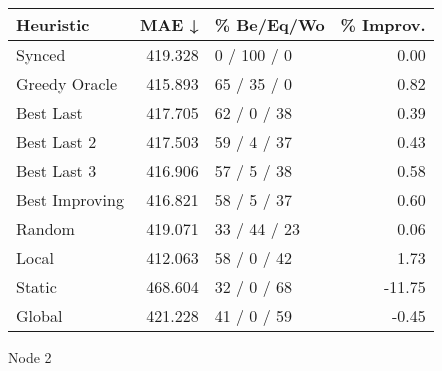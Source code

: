 \begin{tabular}{lrlr}
\toprule
\textbf{Heuristic} & \textbf{MAE ↓} & \textbf{\% Be/Eq/Wo} & \textbf{\% Improv.} \\
\midrule
            Synced &        419.328 &          0 / 100 / 0 &                0.00 \\
     Greedy Oracle &        415.893 &          65 / 35 / 0 &                0.82 \\
         Best Last &        417.705 &          62 / 0 / 38 &                0.39 \\
       Best Last 2 &        417.503 &          59 / 4 / 37 &                0.43 \\
       Best Last 3 &        416.906 &          57 / 5 / 38 &                0.58 \\
    Best Improving &        416.821 &          58 / 5 / 37 &                0.60 \\
            Random &        419.071 &         33 / 44 / 23 &                0.06 \\
             Local &        412.063 &          58 / 0 / 42 &                1.73 \\
            Static &        468.604 &          32 / 0 / 68 &              -11.75 \\
            Global &        421.228 &          41 / 0 / 59 &               -0.45 \\
\bottomrule
\end{tabular}
\caption{Node 2}
\label{tab:iid_lr01_le2_bs2_2}
